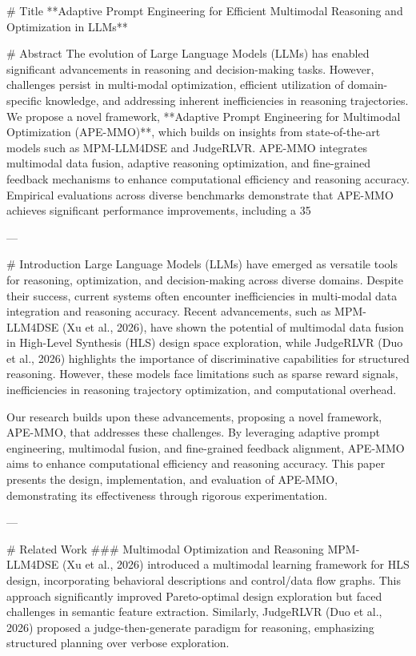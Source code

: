 # Title  
**Adaptive Prompt Engineering for Efficient Multimodal Reasoning and Optimization in LLMs**

# Abstract  
The evolution of Large Language Models (LLMs) has enabled significant advancements in reasoning and decision-making tasks. However, challenges persist in multi-modal optimization, efficient utilization of domain-specific knowledge, and addressing inherent inefficiencies in reasoning trajectories. We propose a novel framework, **Adaptive Prompt Engineering for Multimodal Optimization (APE-MMO)**, which builds on insights from state-of-the-art models such as MPM-LLM4DSE and JudgeRLVR. APE-MMO integrates multimodal data fusion, adaptive reasoning optimization, and fine-grained feedback mechanisms to enhance computational efficiency and reasoning accuracy. Empirical evaluations across diverse benchmarks demonstrate that APE-MMO achieves significant performance improvements, including a 35%

---

# Introduction  
Large Language Models (LLMs) have emerged as versatile tools for reasoning, optimization, and decision-making across diverse domains. Despite their success, current systems often encounter inefficiencies in multi-modal data integration and reasoning accuracy. Recent advancements, such as MPM-LLM4DSE (Xu et al., 2026), have shown the potential of multimodal data fusion in High-Level Synthesis (HLS) design space exploration, while JudgeRLVR (Duo et al., 2026) highlights the importance of discriminative capabilities for structured reasoning. However, these models face limitations such as sparse reward signals, inefficiencies in reasoning trajectory optimization, and computational overhead.

Our research builds upon these advancements, proposing a novel framework, APE-MMO, that addresses these challenges. By leveraging adaptive prompt engineering, multimodal fusion, and fine-grained feedback alignment, APE-MMO aims to enhance computational efficiency and reasoning accuracy. This paper presents the design, implementation, and evaluation of APE-MMO, demonstrating its effectiveness through rigorous experimentation.

---

# Related Work  
### Multimodal Optimization and Reasoning  
MPM-LLM4DSE (Xu et al., 2026) introduced a multimodal learning framework for HLS design, incorporating behavioral descriptions and control/data flow graphs. This approach significantly improved Pareto-optimal design exploration but faced challenges in semantic feature extraction. Similarly, JudgeRLVR (Duo et al., 2026) proposed a judge-then-generate paradigm for reasoning, emphasizing structured planning over verbose exploration.

